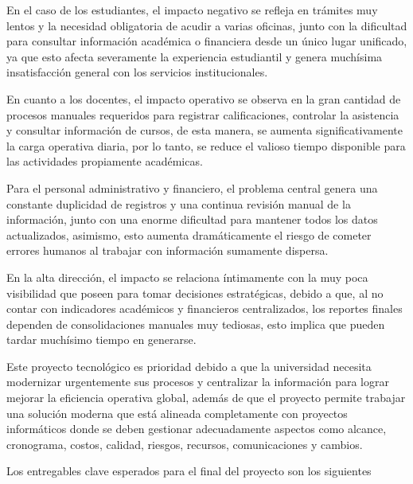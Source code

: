 \documentclass[11pt,spanish]{article}
\begin{document}
En el caso de los estudiantes, el impacto negativo se refleja en trámites muy lentos y la necesidad obligatoria de acudir a varias oficinas, junto con la dificultad para consultar información académica o financiera desde un único lugar unificado, ya que esto afecta severamente la experiencia estudiantil y genera muchísima insatisfacción general con los servicios institucionales.

En cuanto a los docentes, el impacto operativo se observa en la gran cantidad de procesos manuales requeridos para registrar calificaciones, controlar la asistencia y consultar información de cursos, de esta manera, se aumenta significativamente la carga operativa diaria, por lo tanto, se reduce el valioso tiempo disponible para las actividades propiamente académicas.

Para el personal administrativo y financiero, el problema central genera una constante duplicidad de registros y una continua revisión manual de la información, junto con una enorme dificultad para mantener todos los datos actualizados, asimismo, esto aumenta dramáticamente el riesgo de cometer errores humanos al trabajar con información sumamente dispersa.

En la alta dirección, el impacto se relaciona íntimamente con la muy poca visibilidad que poseen para tomar decisiones estratégicas, debido a que, al no contar con indicadores académicos y financieros centralizados, los reportes finales dependen de consolidaciones manuales muy tediosas, esto implica que pueden tardar muchísimo tiempo en generarse.

Este proyecto tecnológico es prioridad debido a que la universidad necesita modernizar urgentemente sus procesos y centralizar la información para lograr mejorar la eficiencia operativa global, además de que el proyecto permite trabajar una solución moderna que está alineada completamente con proyectos informáticos donde se deben gestionar adecuadamente aspectos como alcance, cronograma, costos, calidad, riesgos, recursos, comunicaciones y cambios.

Los entregables clave esperados para el final del proyecto son los siguientes
\end{document}
